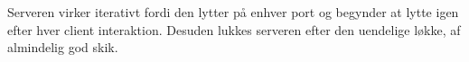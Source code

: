 \noindent Serveren virker iterativt fordi den lytter på enhver port og begynder at lytte igen efter hver client interaktion. Desuden lukkes serveren efter den uendelige løkke, af almindelig god skik.


%
%
%
%
%
%
%
%
%
%
